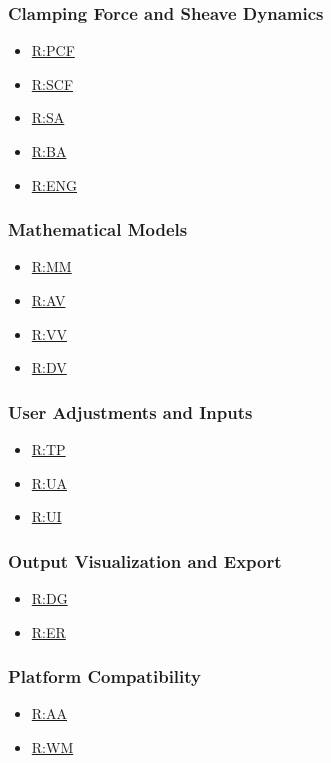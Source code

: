 \documentclass[12pt]{article}
\newcommand{\hpref}[1]{\hyperref[#1]{#1}}
\begin{document}
  \subsubsection{Clamping Force and Sheave Dynamics}
  \label{subsec:Clamping Force and Sheave Dynamics}
  \begin{itemize}
      \item \hpref{R:PCF}
      \item \hpref{R:SCF}
      \item \hpref{R:SA}
      \item \hpref{R:BA}
      \item \hpref{R:ENG}
  \end{itemize}

  \subsubsection{Mathematical Models}
  \label{subsec:Mathematical Models}
  \begin{itemize}
       \item \hpref{R:MM}
       \item \hpref{R:AV}
       \item \hpref{R:VV}
       \item \hpref{R:DV}
  \end{itemize}
  
  \subsubsection{User Adjustments and Inputs}
  \label{subsec:User Adjustments and Inputs}
  \begin{itemize}
      \item \hpref{R:TP}
      \item \hpref{R:UA}
      \item \hpref{R:UI}
  \end{itemize}

  \subsubsection{Output Visualization and Export}
  \begin{itemize}
      \item \hpref{R:DG}
      \item \hpref{R:ER}
  \end{itemize}
  
  \subsubsection{Platform Compatibility}
  \begin{itemize}
      \item \hpref{R:AA}
      \item \hpref{R:WM}
  \end{itemize}
  
\end{document}
